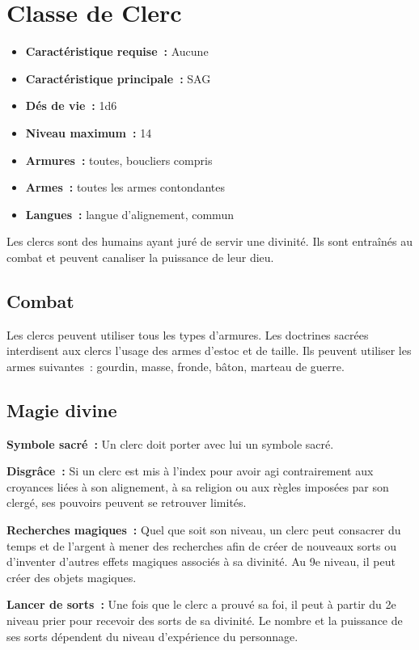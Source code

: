 
\section{Classe de Clerc}\label{clerc}
\begin{itemize}
  \item \textbf{Caractéristique requise~:} Aucune
  \item \textbf{Caractéristique principale~:} SAG
  \item \textbf{Dés de vie~:} 1d6
  \item \textbf{Niveau maximum~:} 14
  \item \textbf{Armures~:} toutes, boucliers compris
  \item \textbf{Armes~:} toutes les armes contondantes
  \item \textbf{Langues~:} langue d'alignement, commun
\end{itemize}

Les clercs sont des humains ayant juré de servir une divinité.
Ils sont entraînés au combat et peuvent canaliser la puissance de leur dieu.

\subsection{Combat}\label{cls:combat}

Les clercs peuvent utiliser tous les types d'armures. Les doctrines
sacrées interdisent aux clercs l'usage des armes d'estoc et de taille.
Ils peuvent utiliser les armes suivantes~: gourdin, masse, fronde,
bâton, marteau de guerre.

\subsection{Magie divine}\label{magie-divine}

\textbf{Symbole sacré~:} Un clerc doit porter avec lui un symbole sacré.

\textbf{Disgrâce~:} Si un clerc est mis à l'index pour avoir agi
contrairement aux croyances liées à son alignement, à sa religion ou aux
règles imposées par son clergé, ses pouvoirs peuvent se retrouver
limités.

\textbf{Recherches magiques~:} Quel que soit son niveau, un clerc peut
consacrer du temps et de l'argent à mener des recherches afin de créer
de nouveaux sorts ou d'inventer d'autres effets magiques associés à sa
divinité. Au 9e niveau, il peut créer des objets magiques.

\textbf{Lancer de sorts~:} Une fois que le clerc a prouvé sa foi, il
peut à partir du 2e niveau prier pour recevoir des sorts de sa divinité.
Le nombre et la puissance de ses sorts dépendent du niveau d'expérience
du personnage.

